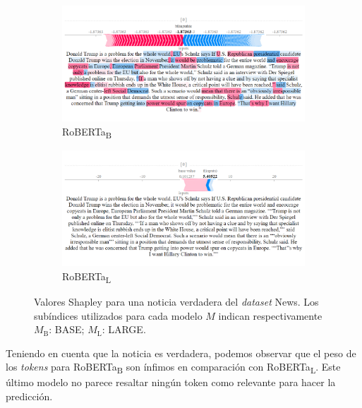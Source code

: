 \begin{figure}[!h]
    \captionsetup[subfigure]{justification=Centering}

    \begin{subfigure}[t]{0.4\textwidth}
        \includegraphics[width=\textwidth]{figs/news_T/roberta-b.png}
        \caption{{RoBERTa}\textsubscript{B}}
    \end{subfigure}
    \hspace{\fill} %
    \begin{subfigure}[t]{0.4\textwidth}
        \includegraphics[width=\linewidth]{figs/news_T/roberta-l.png}
        \caption{{RoBERTa}\textsubscript{L}}
    \end{subfigure}
    
    \caption{Valores Shapley para una noticia verdadera del \textit{dataset} News. Los subíndices utilizados para cada modelo $M$ indican respectivamente $M_{\text{B}}$: BASE; $M_{\text{L}}$: LARGE.}
    
\end{figure}

Teniendo en cuenta que la noticia es verdadera, podemos observar que el peso de los \textit{tokens} para {RoBERTa}\textsubscript{B} son ínfimos en comparación con {RoBERTa}\textsubscript{L}. Este último modelo no parece resaltar ningún token como relevante para hacer la predicción. 

